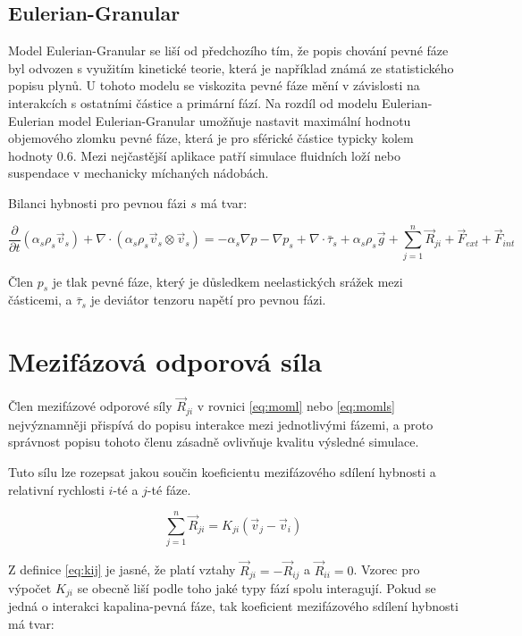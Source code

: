 \subsection{Eulerian-Granular}
Model Eulerian-Granular se liší od předchozího tím, že  popis chování pevné fáze byl odvozen s využitím kinetické teorie, která je například známá ze statistického popisu plynů. U tohoto modelu se viskozita pevné fáze mění v závislosti na interakcích s ostatními částice a primární fází. Na rozdíl od modelu Eulerian-Eulerian model Eulerian-Granular umožňuje nastavit maximální hodnotu objemového zlomku pevné fáze, která je pro sférické částice typicky kolem hodnoty \num{0.6}. Mezi nejčastější aplikace patří simulace fluidních loží nebo suspendace v mechanicky míchaných nádobách.

Bilanci hybnosti pro pevnou fázi $s$ má tvar:

\begin{equation}
	\frac{\partial}{\partial t} (\alpha_{s}\rho_{s}\vec{v}_{s}) + \nabla \cdot (\alpha_{s}\rho_{s} \vec{v}_{s} \otimes \vec{v}_{s}) = -\alpha_{s} \nabla p - \nabla p_{s} + \nabla \cdot \bar{\tau}_{s} + \alpha_{s}\rho_{s}\vec{g} + \sum_{j=1}^n \vec{R}_{ji} + \vec{F}_{ext} + \vec{F}_{int}
	\label{eq:momls}
\end{equation}
  
\noindent Člen $p_{s}$ je tlak pevné fáze, který je důsledkem neelastických srážek mezi částicemi, a $\bar{\tau}_{s}$ je deviátor tenzoru napětí pro pevnou fázi.       

\section{Mezifázová odporová síla}

Člen mezifázové odporové síly $\vec{R}_{ji}$ v rovnici \ref{eq:moml} nebo \ref{eq:momls} nejvýznamněji přispívá do popisu interakce mezi jednotlivými fázemi, a proto správnost popisu tohoto členu zásadně ovlivňuje kvalitu výsledné simulace. 

Tuto sílu lze rozepsat jakou součin koeficientu mezifázového sdílení hybnosti a relativní rychlosti $i$-té a $j$-té fáze.

\begin{equation}
	\sum_{j=1}^n \vec{R}_{ji} = K_{ji} \left( \vec{v}_{j} - \vec{v}_{i} \right)
	\label{eq:kij}
\end{equation}

\noindent Z definice \ref{eq:kij} je jasné, že platí vztahy $\vec{R}_{ji} = -\vec{R}_{ij}$ a $\vec{R}_{ii} = 0$. Vzorec pro výpočet $K_{ji}$ se obecně liší podle toho jaké typy fází spolu interagují. Pokud se jedná o interakci kapalina-pevná fáze, tak koeficient mezifázového sdílení hybnosti má tvar:

